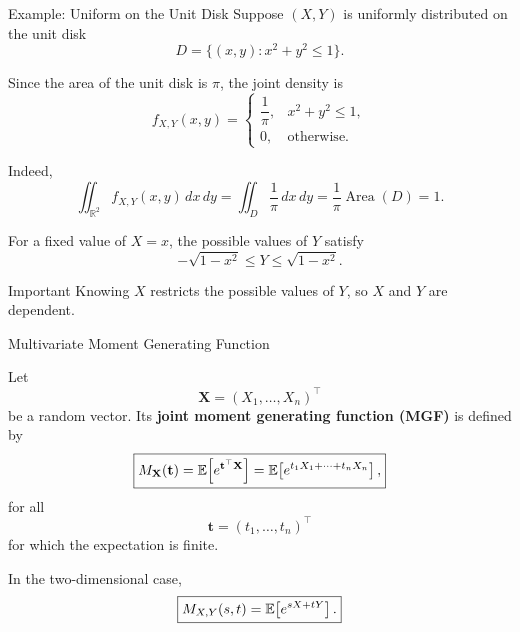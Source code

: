  




\begin{frame}{Example: Uniform on the Unit Disk}
Suppose \((X,Y)\) is uniformly distributed on the unit disk
\[
D=\{(x,y):x^2+y^2\le 1\}.
\]

Since the area of the unit disk is \(\pi\), the joint density is
\[
f_{X,Y}(x,y)
=
\begin{cases}
\dfrac{1}{\pi}, & x^2+y^2\le 1,\\[6pt]
0, & \text{otherwise}.
\end{cases}
\]

Indeed,
\[
\iint_{\mathbb{R}^2} f_{X,Y}(x,y)\,dx\,dy
=
\iint_D \frac{1}{\pi}\,dx\,dy
=
\frac{1}{\pi}\operatorname{Area}(D)
=
1.
\]

For a fixed value of \(X=x\), the possible values of \(Y\) satisfy
\[
-\sqrt{1-x^2}\le Y\le \sqrt{1-x^2}.
\]

\begin{keybox}{Important}
Knowing \(X\) restricts the possible values of \(Y\), so \(X\) and \(Y\) are dependent.
\end{keybox}
\end{frame}


















\begin{frame}{Multivariate Moment Generating Function}

Let
$$
\mathbf X=(X_1,\dots,X_n)^\top
$$
be a random vector. Its \textbf{joint moment generating function (MGF)} is defined by
$$
\boxed{
M_{\mathbf X}(\mathbf t)
=
\mathbb{E}\!\left[e^{\mathbf t^\top \mathbf X}\right]
=
\mathbb{E}\!\left[
e^{t_1X_1+\cdots+t_nX_n}
\right],
}
$$
for all
$$
\mathbf t=(t_1,\dots,t_n)^\top
$$
for which the expectation is finite.

In the two-dimensional case,
$$
\boxed{
M_{X,Y}(s,t)
=
\mathbb{E}\!\left[e^{sX+tY}\right].
}
$$
 
 

\end{frame}



